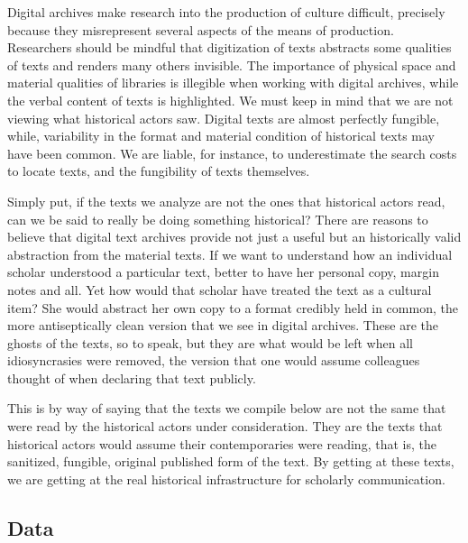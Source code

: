 \documentclass[]{book}
\theoremstyle{definition}
\theoremstyle{definition}
\theoremstyle{definition}
\theoremstyle{remark}
\begin{document}
Digital archives make research into the production of culture difficult,
precisely because they misrepresent several aspects of the means of
production. Researchers should be mindful that digitization of texts
abstracts some qualities of texts and renders many others invisible. The
importance of physical space and material qualities of libraries is
illegible when working with digital archives, while the verbal content
of texts is highlighted. We must keep in mind that we are not viewing
what historical actors saw. Digital texts are almost perfectly fungible,
while, variability in the format and material condition of historical
texts may have been common. We are liable, for instance, to
underestimate the search costs to locate texts, and the fungibility of
texts themselves.

Simply put, if the texts we analyze are not the ones that historical
actors read, can we be said to really be doing something historical?
There are reasons to believe that digital text archives provide not just
a useful but an historically valid abstraction from the material texts.
If we want to understand how an individual scholar understood a
particular text, better to have her personal copy, margin notes and all.
Yet how would that scholar have treated the text as a cultural item? She
would abstract her own copy to a format credibly held in common, the
more antiseptically clean version that we see in digital archives. These
are the ghosts of the texts, so to speak, but they are what would be
left when all idiosyncrasies were removed, the version that one would
assume colleagues thought of when declaring that text publicly.

This is by way of saying that the texts we compile below are not the
same that were read by the historical actors under consideration. They
are the texts that historical actors would assume their contemporaries
were reading, that is, the sanitized, fungible, original published form
of the text. By getting at these texts, we are getting at the real
historical infrastructure for scholarly communication.

\hypertarget{data-1}{%
\subsection{Data}\label{data-1}}
\end{document}
